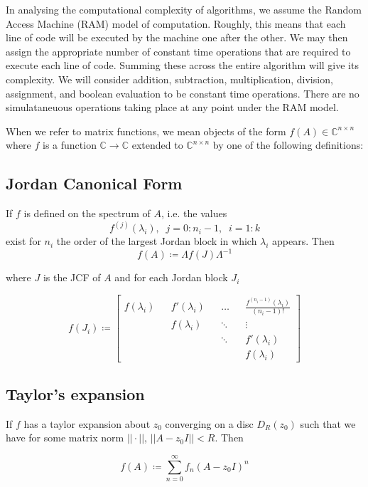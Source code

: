\documentclass{article}
\newcommand{\bC}{\mathbb{C}}
\begin{document}
In analysing the computational complexity of algorithms, we assume the Random Access Machine (RAM) model of computation. Roughly, this means that each line of code will be executed by the machine one after the other. We may then assign the appropriate number of constant time operations that are required to execute each line of code. Summing these across the entire algorithm will give its complexity. We will consider addition, subtraction, multiplication, division, assignment, and boolean evaluation to be constant time operations. There are no simulataneuous operations taking place at any point under the RAM model.

When we refer to matrix functions, we mean objects of the form $f(A) \in \bC^{n\times n}$ where $f$ is a function $\bC \rightarrow \bC$ extended to $\bC ^{n \times n}$ by one of the following definitions:

\subsection{Jordan Canonical Form}
If $f$ is defined on the spectrum of $A$, i.e. the values
$$ f^{(j)}(\lambda_i), \; \; j = 0:n_i-1, \; \; i = 1:k$$
exist for $n_i$ the order of the largest Jordan block in which $\lambda_i$ appears. Then
\begin{equation}
  f(A) \coloneqq \Lambda f(J) \Lambda^{-1}
\end{equation}

where $J$ is the JCF of $A$ and for each Jordan block $J_i$

$$f(J_i) \coloneqq \begin{bmatrix} f(\lambda_i) && f'(\lambda_i)
&& \ldots && \frac{f^{(n_i-1)}(\lambda_i)}{(n_i -1)!} \\
&& f(\lambda_i) && \ddots && \vdots \\
&& && \ddots && f'(\lambda_i) \\
&& && && f(\lambda_i) \end{bmatrix}$$

\subsection{Taylor's expansion}
If $f$ has a taylor expansion about $z_0$ converging on a disc $D_R(z_0)$ such that we have for some matrix norm $||\cdot||$, $|| A - z_0I|| < R $.  Then

\begin{equation}
  f(A) \coloneqq \sum_{n=0}^{\infty} f_n(A - z_0I)^n
\end{equation}
\end{document}
